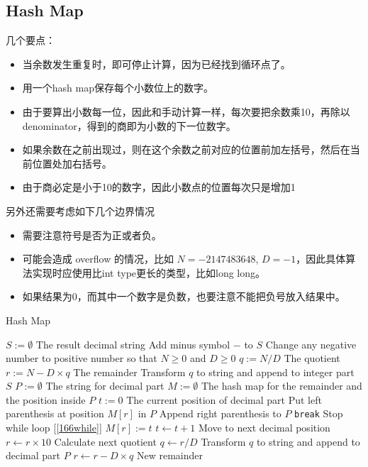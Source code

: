 \subsection{Hash Map}
\begin{CJK*}{UTF8}{gbsn}
几个要点：
\begin{itemize}
    \item 当余数发生重复时，即可停止计算，因为已经找到循环点了。
    \item 用一个hash map保存每个小数位上的数字。
    \item 由于要算出小数每一位，因此和手动计算一样，每次要把余数乘10，再除以denominator，得到的商即为小数的下一位数字。
    \item 如果余数在之前出现过，则在这个余数之前对应的位置前加左括号，然后在当前位置处加右括号。
    \item 由于商必定是小于10的数字，因此小数点的位置每次只是增加1
\end{itemize}
另外还需要考虑如下几个边界情况
\begin{itemize}
    \item 需要注意符号是否为正或者负。
    \item 可能会造成 overflow 的情况，比如 $N = -2147483648$, $D = -1$，因此具体算法实现时应使用比int type更长的类型，比如long long。
    \item 如果结果为0，而其中一个数字是负数，也要注意不能把负号放入结果中。
\end{itemize}
\end{CJK*}
\setcounter{algorithm}{0}
\begin{algorithm}[H]
\caption{Hash Map}
\begin{algorithmic}[1]
\State $S:=\emptyset$ \Comment The result decimal string
\State Add minus symbol $-$ to $S$
\State Change any negative number to positive number so that $N\geq0$ and $D\geq0$ 
\EndIf
\State $q:=N/D$ \Comment The quotient
\State $r:=N - D\times q$ \Comment The remainder
\State Transform $q$ to string and append to integer part $S$
\State $P:=\emptyset$ \Comment The string for decimal part
\State $M:=\emptyset$ \Comment The hash map for the remainder and the position inside $P$
\State $t:=0$ \Comment The current position of decimal part
 \label{166while}
\State Put left parenthesis at position $M[r]$ in $P$
\State Append right parenthesis to $P$
\State \texttt{break} \Comment Stop while loop [\ref{166while}]
\EndIf
\State $M[r]:=t$
\State $t\gets t+1$ \Comment Move to next decimal position
\State $r\gets r\times 10$ \Comment Calculate next quotient
\State $q \gets r / D$
\State Transform $q$ to string and append to decimal part $P$
\State $r\gets r - D\times q$ \Comment New remainder
\EndWhile
{}
\end{algorithmic}
\end{algorithm}
